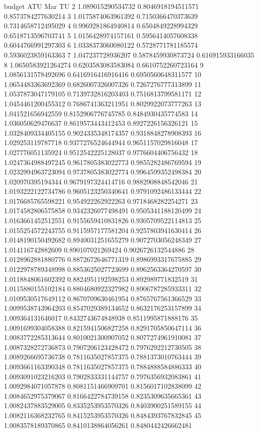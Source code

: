 budget	ATU	Mar	TU
2	1.089015290534732	0.8046918194511571	0.8573784277630214
3	1.0175874063961392	0.7150366470373639	0.7314658712495029
4	0.9969281864940814	0.6504849228994329	0.6518713596703741
5	1.0156428974157161	0.5956414057608338	0.6044766991297303
6	1.0338373060080122	0.5728771781185574	0.5936023859163363
7	1.047237728936207	0.5878459930873724	0.616915933166035
8	1.0650583921264274	0.6203583083583084	0.6610752260723164
9	1.0856131578492696	0.6416916416916416	0.6950560648311577
10	1.0654483363692369	0.6826007326007326	0.7267276777313899
11	1.0537873047179105	0.7139732816203403	0.7516813799581171
12	1.0454461200455312	0.7686741363211951	0.8029922073777263
13	1.041521656942559	0.8152906776745785	0.8484930435774583
14	1.036050629476637	0.8619573443412453	0.8927226156326121
15	1.0328409334405155	0.9024335348174357	0.9318848278908393
16	1.029253119787718	0.9377276524644944	0.9651157029816048
17	1.027776051135924	0.9512542225128037	0.9776604406756432
18	1.0247364988497245	0.9617805383022773	0.9855282486769594
19	1.0232994963723094	0.9737805383022774	0.9964599352498384
20	1.020970395194344	0.9679197324414716	0.9882908848542046
21	1.0193222122734786	0.9605123250340641	0.9791092486133444
22	1.0176685765598221	0.954922262922263	0.9718468282254271
23	1.0174582806575858	0.9342326077498491	0.9505341188120499
24	1.0163661452512551	0.9155659410831826	0.9305709522114813
25	1.0155254572243755	0.9115957177581204	0.9257803941630414
26	1.0148190150492682	0.8940031251655279	0.9072703056248349
27	1.014116742882609	0.890107021269424	0.9026726132544886
28	1.0128962881880776	0.8872672646771319	0.8986993317675885
29	1.0122978789348998	0.8853625027723699	0.8962563364270597
30	1.0118848061602392	0.8824951192598253	0.892989771832519
31	1.0115880155102184	0.8804680922327982	0.8906787285933311
32	1.0109530517649112	0.8670709630461954	0.8765767561366529
33	1.0099538743964203	0.8547029389134652	0.8632176253157899
34	1.009364131646017	0.8432743674848938	0.8511995871888176
35	1.0091699304058388	0.8215941506827258	0.8291705850647114
36	1.0083772285313644	0.8010021300907052	0.8077274961910081
37	1.0087328272736873	0.7907206123428472	0.7976292212730505
38	1.0089266695736738	0.7811635027857375	0.7881373010763444
39	1.0093661163390348	0.7811635027857375	0.7884888584886333
40	1.0093091023216203	0.7902833331144757	0.7976356932083861
41	1.0092984071057878	0.8081151466909701	0.8156017102838099
42	1.0084652975379067	0.8166422784739158	0.8235309635665361
43	1.0082437883529005	0.8335253953570326	0.8403900251589155
44	1.0082116368232765	0.8415253953570326	0.8484393767832845
45	1.0083578189370865	0.8410138864056261	0.8480442426662481
